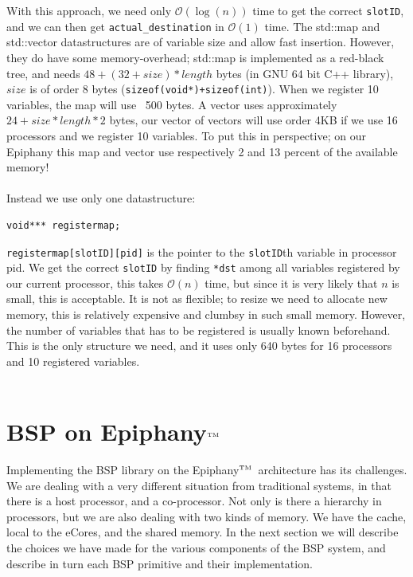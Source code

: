 \documentclass[fleqn]{article}
\renewcommand{\(}{\left(}
\renewcommand{\)}{\right)}
\def\tm{$^{\hbox{\tiny TM}}$~}
\begin{document}
With this approach, we need only $\mathcal{O}(\log(n))$ time to get the correct \texttt{slotID}, and we can then get \texttt{actual\_destination} in $\mathcal{O}(1)$ time. The std::map and std::vector datastructures are of variable size and allow fast insertion. However, they do have some memory-overhead; std::map is implemented as a red-black tree, and needs $48+(32+size)*length$ bytes (in GNU 64 bit C++ library), $size$ is of order 8 bytes (\texttt{sizeof(void*)+sizeof(int)}). When we register 10 variables, the map will use ~500 bytes. A vector uses approximately $24+size*length*2$ bytes, our vector of vectors will use order 4KB if we use 16 processors and we register 10 variables. To put this in perspective; on our Epiphany this map and vector use respectively 2 and 13 percent of the available memory!\\
\\
Instead we use only one datastructure:
\begin{lstlisting}
void*** registermap;
\end{lstlisting}
\texttt{registermap[slotID][pid]} is the pointer to the \texttt{slotID}th variable in processor pid.
We get the correct \texttt{slotID} by finding \texttt{*dst} among all variables registered by our current processor, this takes $\mathcal{O}(n)$ time, but since it is very likely that $n$ is small, this is acceptable. It is not as flexible; to resize we need to allocate new memory, this is relatively expensive and clumbsy in such small memory. However, the number of variables that has to be registered is usually known beforehand. This is the only structure we need, and it uses only 640 bytes for 16 processors and 10 registered variables.\\
\\


\section{BSP on Epiphany\tm}

Implementing the BSP library on the Epiphany\tm architecture has its challenges. We are dealing with a very different situation from traditional systems, in that there is a host processor, and a co-processor. Not only is there a hierarchy in processors, but we are also dealing with two kinds of memory. We have the cache, local to the eCores, and the shared memory. In the next section we will describe the choices we have made for the various components of the BSP system, and describe in turn each BSP primitive and their implementation.
\end{document}
